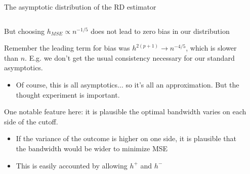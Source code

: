 \documentclass[notes,11pt, aspectratio=169]{beamer}
\newenvironment{wideitemize}{\itemize\addtolength{\itemsep}{10pt}}{\enditemize}
\begin{document}
\begin{frame}{The asymptotic distribution of the RD estimator}
    \begin{columns}[onlytextwidth, T] %
      \begin{column}{.9\textwidth}
        \begin{wideitemize}
        \item But choosing $h_{MSE} \propto  n^{-1/5}$ does not lead to zero bias in our distribution
        \item Remember the leading term for bias was
          $h^{2(p+1)} \rightarrow n^{-4/5}$, which is slower than
          $n$. E.g. we don't get the usual consistency necessary for
          our standard asymptotics.
          \begin{itemize}
          \item Of course, this is all asymptotics... so it's all an
            approximation. But the thought experiment is important.
          \end{itemize}
        \item One notable feature here: it is plausible the optimal
          bandwidth varies on each side of the cutoff.
          \begin{itemize}
          \item If the variance of the outcome is higher on one side,
            it is plausible that the bandwidth would be wider to
            minimize MSE
          \item This is easily accounted by allowing $h^{+}$ and
            $h^{-}$
          \end{itemize}
      \end{wideitemize}
      \end{column}%
      \hfill%
      \begin{column}{.5\textwidth}
      \end{column}%
    \end{columns}
\end{frame}
\end{document}
